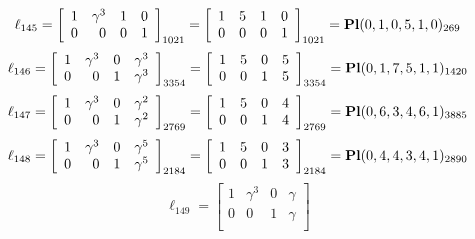 \documentclass{article}
\begin{document}
{$$
\ell_{145} = 
\left[
\begin{array}{*{4}{r}}
1 & \gamma^{3} & 1 & 0\\
0 & 0 & 0 & 1\\
\end{array}
\right]
_{1021}
=
\left[
\begin{array}{*{4}c}
1  & 5  & 1  & 0\\
0  & 0  & 0  & 1\\
\end{array}
\right]_{1021}
={\rm\bf Pl}(0,1,0,5,1,0 )_{269}$$
$$
\ell_{146} = 
\left[
\begin{array}{*{4}{r}}
1 & \gamma^{3} & 0 & \gamma^{3}\\
0 & 0 & 1 & \gamma^{3}\\
\end{array}
\right]
_{3354}
=
\left[
\begin{array}{*{4}c}
1  & 5  & 0  & 5\\
0  & 0  & 1  & 5\\
\end{array}
\right]_{3354}
={\rm\bf Pl}(0,1,7,5,1,1 )_{1420}$$
$$
\ell_{147} = 
\left[
\begin{array}{*{4}{r}}
1 & \gamma^{3} & 0 & \gamma^{2}\\
0 & 0 & 1 & \gamma^{2}\\
\end{array}
\right]
_{2769}
=
\left[
\begin{array}{*{4}c}
1  & 5  & 0  & 4\\
0  & 0  & 1  & 4\\
\end{array}
\right]_{2769}
={\rm\bf Pl}(0,6,3,4,6,1 )_{3885}$$
$$
\ell_{148} = 
\left[
\begin{array}{*{4}{r}}
1 & \gamma^{3} & 0 & \gamma^{5}\\
0 & 0 & 1 & \gamma^{5}\\
\end{array}
\right]
_{2184}
=
\left[
\begin{array}{*{4}c}
1  & 5  & 0  & 3\\
0  & 0  & 1  & 3\\
\end{array}
\right]_{2184}
={\rm\bf Pl}(0,4,4,3,4,1 )_{2890}$$
$$
\ell_{149} = 
\left[
\begin{array}{*{4}{r}}
1 & \gamma^{3} & 0 & \gamma \\
0 & 0 & 1 & \gamma \\
\end{array}
\right]
$$}
\end{document}
